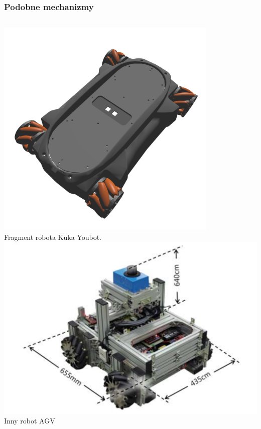 \documentclass{beamer}
\begin{document}
	\begin{frame}
		\frametitle{Podobne mechanizmy}
		\begin{columns}[c]
			\centering
			\includegraphics[width=0.8\textwidth]{graphics/youbot.png} \\
			Fragment robota Kuka Youbot.
			\centering
			\includegraphics[width=\textwidth]{graphics/agv.png} \\
			Inny robot AGV\footnotemark
		\end{columns}
	\end{frame}
\end{document}
